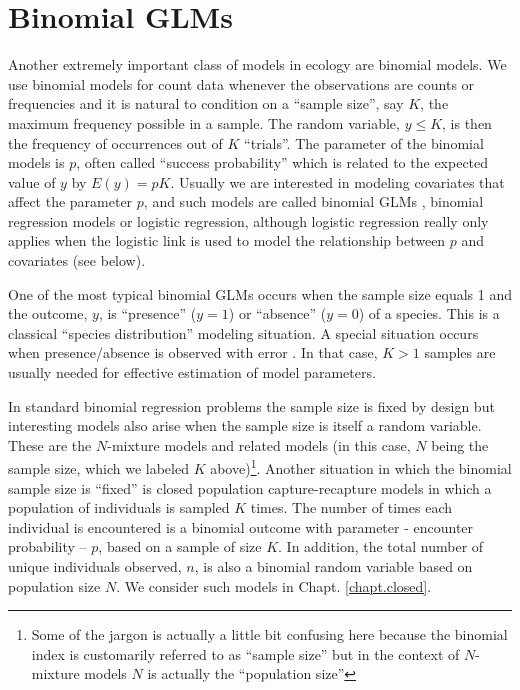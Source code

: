 \section{Binomial GLMs}

Another extremely important class of models in ecology are
binomial models. We use binomial models for count data whenever the
observations are counts or frequencies and it is natural to condition
on a ``sample size'', say $K$, the maximum frequency possible in a sample.
 The random variable, $y \le K$, is then the
frequency of occurrences out of $K$ ``trials''. The parameter of the binomial
models is $p$, often called ``success probability'' which is related
to the expected value of $y$ by $E(y) = pK$. Usually we are interested
in modeling covariates that affect the parameter $p$, and such models
are called binomial GLMs , binomial
regression models or logistic regression, although logistic regression
 really only applies when the logistic link is used to model
the relationship between $p$ and covariates (see below).

One of the most typical binomial GLMs occurs when the sample size
equals 1 and the outcome, $y$, is ``presence'' ($y=1$) or ``absence''
($y=0$) of a species. This is a classical ``species distribution''
modeling situation. A special situation occurs when presence/absence
is observed with error \citep{mackenzie_etal:2002,tyre_etal:2003}.
In that case, $K>1$ samples
are usually needed for effective estimation of model parameters.

 In standard binomial regression problems the sample size
is fixed by design but interesting models also arise when the sample
size is itself a random variable. These are the $N$-mixture models
\citep{royle:2004, kery_etal:2005, royle_dorazio:2008, kery:2010}
and related models (in this case, $N$ being the sample size,
which we labeled $K$ above)\footnote{Some of the jargon is actually a little
bit confusing here
because the binomial index is customarily referred to as ``sample size''
but in the context of $N$-mixture models $N$ is actually the
``population size''}.
Another
situation in which the binomial sample size is ``fixed'' is closed
population capture-recapture models in which a population of
individuals is sampled $K$ times.  The number of times each individual
is encountered is a binomial outcome with parameter - encounter
probability -- $p$, based on a sample of size $K$.  In addition, the
total number of unique individuals observed, $n$, is also a binomial
random variable based on population size $N$.  We consider such
models in Chapt. \ref{chapt.closed}.


